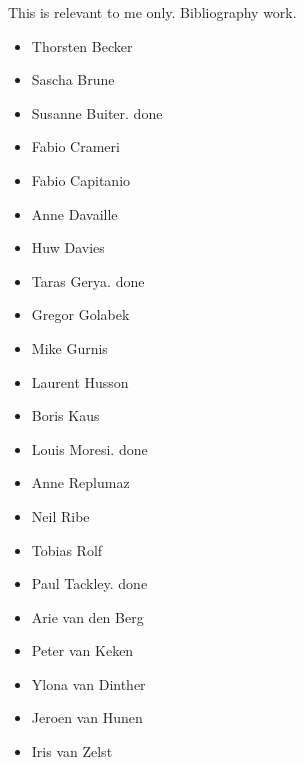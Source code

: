 
This is relevant to me only. Bibliography work.
\begin{itemize}
\item Thorsten Becker
\item Sascha Brune
\item Susanne Buiter. done
\item Fabio Crameri
\item Fabio Capitanio
\item Anne Davaille
\item Huw Davies
\item Taras Gerya. done
\item Gregor Golabek
\item Mike Gurnis
\item Laurent Husson
\item Boris Kaus 
\item Louis Moresi. done
\item Anne Replumaz
\item Neil Ribe
\item Tobias Rolf
\item Paul Tackley. done
\item Arie van den Berg
\item Peter van Keken 
\item Ylona van Dinther
\item Jeroen van Hunen
\item Iris van Zelst
\end{itemize}
